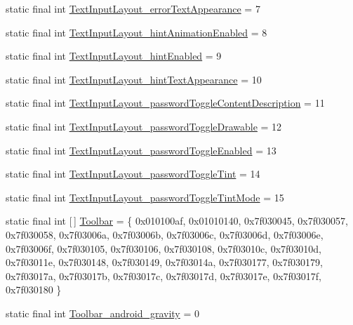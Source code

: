 \begin{DoxyCompactItemize}
static final int \mbox{\hyperlink{classandroid_1_1support_1_1design_1_1R_1_1styleable_a4d09e62deb1742d02e30465768411166}{Text\+Input\+Layout\+\_\+error\+Text\+Appearance}} = 7
\item 
static final int \mbox{\hyperlink{classandroid_1_1support_1_1design_1_1R_1_1styleable_a62485d8990046222153bfc36f409acb4}{Text\+Input\+Layout\+\_\+hint\+Animation\+Enabled}} = 8
\item 
static final int \mbox{\hyperlink{classandroid_1_1support_1_1design_1_1R_1_1styleable_a41e9545f0ccf662d796d06d6b67e254b}{Text\+Input\+Layout\+\_\+hint\+Enabled}} = 9
\item 
static final int \mbox{\hyperlink{classandroid_1_1support_1_1design_1_1R_1_1styleable_a2d3b7ce259d0043d39a949a759dd729d}{Text\+Input\+Layout\+\_\+hint\+Text\+Appearance}} = 10
\item 
static final int \mbox{\hyperlink{classandroid_1_1support_1_1design_1_1R_1_1styleable_ab3a09db55a9bd8349fd2d14ce511a7d1}{Text\+Input\+Layout\+\_\+password\+Toggle\+Content\+Description}} = 11
\item 
static final int \mbox{\hyperlink{classandroid_1_1support_1_1design_1_1R_1_1styleable_a0559e804ed9bbab5f177abc693e96238}{Text\+Input\+Layout\+\_\+password\+Toggle\+Drawable}} = 12
\item 
static final int \mbox{\hyperlink{classandroid_1_1support_1_1design_1_1R_1_1styleable_ab9f843954b547744d3c583c046a1ae25}{Text\+Input\+Layout\+\_\+password\+Toggle\+Enabled}} = 13
\item 
static final int \mbox{\hyperlink{classandroid_1_1support_1_1design_1_1R_1_1styleable_a561ddb9abdf72013c7c9f63ed6e3ce57}{Text\+Input\+Layout\+\_\+password\+Toggle\+Tint}} = 14
\item 
static final int \mbox{\hyperlink{classandroid_1_1support_1_1design_1_1R_1_1styleable_aafbf1a87eadb8c4597771e237a0ca57b}{Text\+Input\+Layout\+\_\+password\+Toggle\+Tint\+Mode}} = 15
\item 
static final int \mbox{[}$\,$\mbox{]} \mbox{\hyperlink{classandroid_1_1support_1_1design_1_1R_1_1styleable_a7783ebe780dbe2a845802a40519a46e9}{Toolbar}} = \{ 0x010100af, 0x01010140, 0x7f030045, 0x7f030057, 0x7f030058, 0x7f03006a, 0x7f03006b, 0x7f03006c, 0x7f03006d, 0x7f03006e, 0x7f03006f, 0x7f030105, 0x7f030106, 0x7f030108, 0x7f03010c, 0x7f03010d, 0x7f03011e, 0x7f030148, 0x7f030149, 0x7f03014a, 0x7f030177, 0x7f030179, 0x7f03017a, 0x7f03017b, 0x7f03017c, 0x7f03017d, 0x7f03017e, 0x7f03017f, 0x7f030180 \}
\item 
static final int \mbox{\hyperlink{classandroid_1_1support_1_1design_1_1R_1_1styleable_ae9f189e116f70336a287fd07ccbad870}{Toolbar\+\_\+android\+\_\+gravity}} = 0

\end{DoxyCompactItemize}
